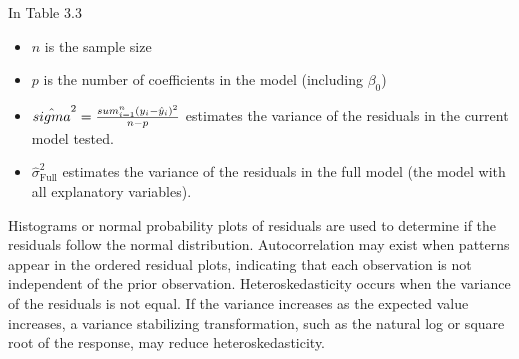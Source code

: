 \documentclass[
]{book}
\providecommand{\tightlist}{%
  \setlength{\itemsep}{0pt}\setlength{\parskip}{0pt}}
\begin{document}
\begin{table}[!h]
\centering
\caption{\label{tab:table33}Variable selection criteria.}
\centering
{}
\end{table}

In Table 3.3

\begin{itemize}
\tightlist
\item
  \(n\) is the sample size
\item
  \(p\) is the number of coefficients in the model (including \(\beta_0\))
\item
  \(\hat{\\sigma}^2 = \frac{\\sum_{i=1}^n (y_i - \hat{y}_i)^2}{n - p}\) estimates the variance of the residuals in the current model tested.
\item
  \(\hat{\sigma}_{\text{Full}}^2\) estimates the variance of the residuals in the full model (the model with all explanatory variables).
\end{itemize}

Histograms or normal probability plots of residuals are used to determine if the residuals follow the normal distribution. Autocorrelation may exist when patterns appear in the ordered residual plots, indicating that each observation is not independent of the prior observation. Heteroskedasticity occurs when the variance of the residuals is not equal. If the variance increases as the expected value increases, a variance stabilizing transformation, such as the natural log or square root of the response, may reduce heteroskedasticity.
\end{document}
